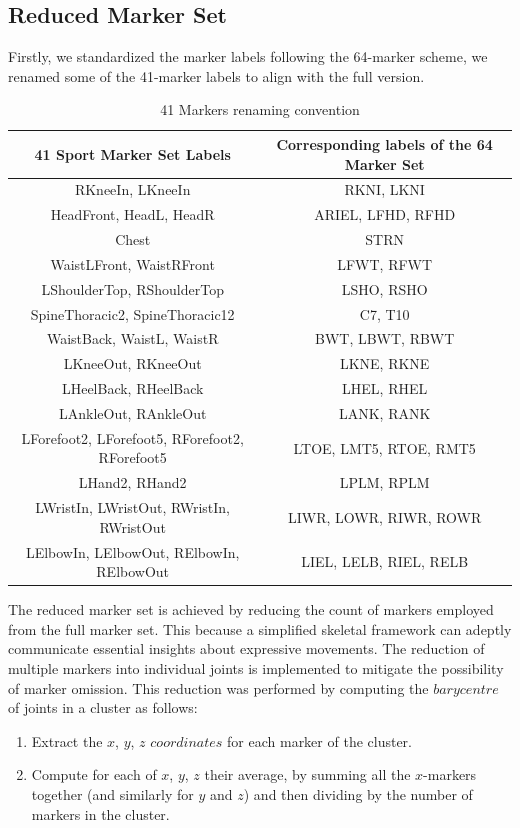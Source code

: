 \subsection{Reduced Marker Set}
Firstly, we standardized the marker labels following the 64-marker scheme, 
we renamed some of the 41-marker labels to align with the full version.

\begin{table}[H]
    \centering
    \begin{tabular}{|c|c|}
    \hline
    \textbf{41 Sport Marker Set Labels} & \textbf{Corresponding labels of the 64 Marker Set} \\
    \hline
    RKneeIn, LKneeIn & RKNI, LKNI \\
    HeadFront, HeadL, HeadR & ARIEL, LFHD, RFHD \\
    Chest & STRN \\
    WaistLFront, WaistRFront & LFWT, RFWT \\
    LShoulderTop, RShoulderTop & LSHO, RSHO \\
    SpineThoracic2, SpineThoracic12 & C7, T10 \\
    WaistBack, WaistL, WaistR & BWT, LBWT, RBWT \\
    LKneeOut, RKneeOut & LKNE, RKNE \\
    LHeelBack, RHeelBack & LHEL, RHEL \\
    LAnkleOut, RAnkleOut & LANK, RANK \\
    LForefoot2, LForefoot5, RForefoot2, RForefoot5& LTOE, LMT5, RTOE, RMT5\\
    LHand2, RHand2 & LPLM, RPLM \\
    LWristIn, LWristOut, RWristIn, RWristOut & LIWR, LOWR, RIWR, ROWR \\
    LElbowIn, LElbowOut, RElbowIn, RElbowOut & LIEL, LELB, RIEL, RELB \\
    \hline
    \end{tabular}
    \caption{41 Markers renaming convention}
    \label{tab:marker_mapping}
\end{table}

The reduced marker set is achieved by reducing the count of markers employed from the full marker set.
This because a simplified skeletal framework can adeptly communicate essential insights about expressive movements.
The reduction of multiple markers into individual joints is implemented to mitigate the possibility of marker omission.
This reduction was performed by computing the $barycentre$ of joints in a cluster as follows:
\begin{enumerate}
    \item Extract the $x$, $y$, $z$ $coordinates$ for each marker of the cluster.
    \item Compute for each of $x$, $y$, $z$ their average, by summing all the $x$-markers together
    (and similarly for $y$ and $z$) and then dividing by the number of markers in the cluster.
\end{enumerate} 



